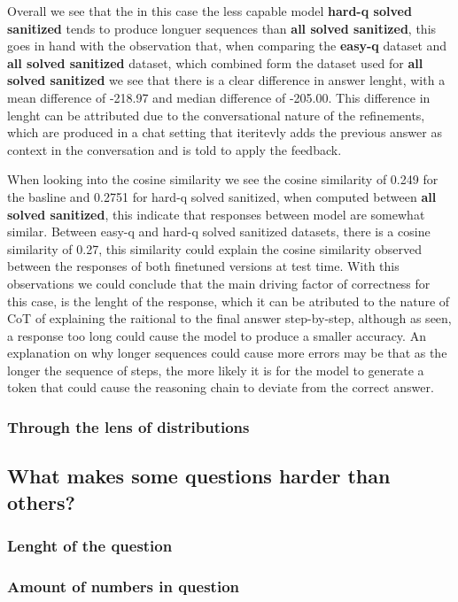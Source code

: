 \documentclass[a4paper,10pt]{article}
\begin{document}
Overall we see that the in this case the less capable model \textbf{hard-q solved sanitized} tends to produce longuer sequences than \textbf{all solved sanitized}, this goes in hand with the observation that, when comparing the \textbf{easy-q} dataset and \textbf{all solved sanitized} dataset, which combined form the dataset used for \textbf{all solved sanitized} we see that there is a clear difference in answer lenght, with a mean difference of -218.97 and median difference of -205.00. This difference in lenght can be attributed due to the conversational nature of the refinements, which are produced in a chat setting that iteritevly adds the previous answer as context in the conversation and is told to apply the feedback. 

When looking into the cosine similarity we see the cosine similarity of 0.249 for the basline and 0.2751 for hard-q solved sanitized, when computed between \textbf{all solved sanitized}, this indicate that responses between model are somewhat similar. Between easy-q and hard-q solved sanitized datasets, there is a cosine similarity of 0.27, this similarity could explain the cosine similarity observed between the responses of both finetuned versions at test time. With this observations we could conclude that the main driving factor of correctness for this case, is the lenght of the response, which it can be atributed to the nature of CoT of explaining the raitional to the final answer step-by-step, although as seen, a response too long could cause the model to produce a smaller accuracy. An explanation on why longer sequences could cause more errors may be that as the longer the sequence of steps, the more likely it is for the model to generate a token that could cause the reasoning chain to deviate from the correct answer.

\subsubsection {Through the lens of distributions}
\subsection{What makes some questions harder than others?}
\subsubsection{Lenght of the question}
\subsubsection{Amount of numbers in question}
\end{document}
